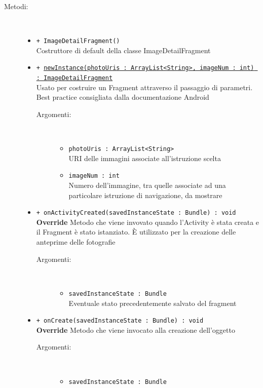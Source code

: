 \documentclass[../DefinizioneDiProdotto.tex]{subfiles}
\begin{document}
\begin{description}
\begin{itemize}
	\end{itemize}
	\item[Metodi:] \
	\begin{itemize}
		\item \texttt{+ ImageDetailFragment()}\\
		Costruttore di default della classe ImageDetailFragment
		\item \texttt{+ \underline{newInstance(photoUris : ArrayList<String>, imageNum : int) : ImageDetailFragment}}\\
		Usato per costruire un Fragment attraverso il passaggio di parametri. Best practice consigliata dalla documentazione Android
		\begin{description}
			\item[Argomenti:] \
			\begin{itemize}
				\item \texttt{photoUris : ArrayList<String>}\\
				URI delle immagini associate all'istruzione scelta\item \texttt{imageNum : int}\\
				Numero dell'immagine, tra quelle associate ad una particolare istruzione di navigazione, da mostrare\end{itemize}
		\end{description}
		\item \texttt{+ onActivityCreated(savedInstanceState : Bundle) : void}\\
		\textbf{Override} Metodo che viene invovato quando l'Activity è stata creata e il Fragment è stato istanziato. È utilizzato per la creazione delle anteprime delle fotografie
		\begin{description}
			\item[Argomenti:] \
			\begin{itemize}
				\item \texttt{savedInstanceState : Bundle}\\
				Eventuale stato precedentemente salvato del fragment\end{itemize}
		\end{description}
		\item \texttt{+ onCreate(savedInstanceState : Bundle) : void}\\
		\textbf{Override} Metodo che viene invocato alla creazione dell'oggetto
		\begin{description}
			\item[Argomenti:] \
			\begin{itemize}
				\item \texttt{savedInstanceState : Bundle}\\

\end{itemize}
\end{description}
\end{itemize}
\end{description}
\end{document}
